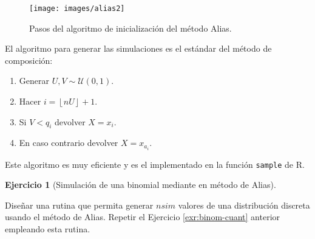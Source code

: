 \documentclass[
]{book}
\theoremstyle{break}
\theoremstyle{definition}
\theoremstyle{definition}
\theoremstyle{definition}
\newtheorem{exercise}{Ejercicio}[chapter]
\theoremstyle{definition}
\theoremstyle{remark}
\begin{document}
\begin{figure}[!htb]

{\centering \texttt{[image: images/alias2]} 

}

\caption{Pasos del algoritmo de inicialización del método Alias.}\label{fig:unnamed-chunk-20}
\end{figure}

El algoritmo para generar las simulaciones es el estándar del método de composición:

\begin{enumerate}
\def\labelenumi{\arabic{enumi}.}
\item
  Generar \(U,V\sim \mathcal{U}\left( 0,1\right)\).
\item
  Hacer \(i=\left\lfloor nU\right\rfloor +1\).
\item
  Si \(V<q_{i}\) devolver \(X=x_{i}\).
\item
  En caso contrario devolver \(X=x_{a_{i}}\).
\end{enumerate}

Este algoritmo es muy eficiente y es el implementado en la función \texttt{sample} de R.

\begin{exercise}[Simulación de una binomial mediante en método de Alias]
\protect\hypertarget{exr:binom-alias}{}{\label{exr:binom-alias} {} }
\end{exercise}

Diseñar una rutina que permita generar \(nsim\) valores de una
distribución discreta usando el método de Alias.
Repetir el Ejercicio \ref{exr:binom-cuant} anterior empleando esta rutina.
\end{document}
